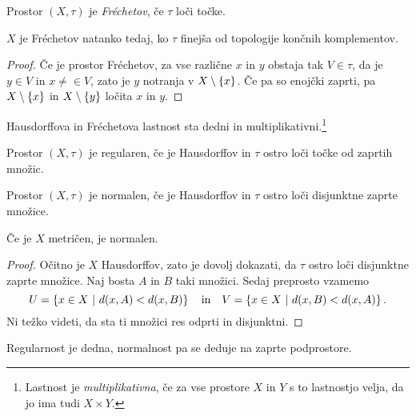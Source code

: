 \begin{definicija}
Prostor $(X, \tau)$ je
\emph{Fréchetov}, če $\tau$
loči točke.
\end{definicija}

\begin{trditev}
$X$ je Fréchetov natanko tedaj, ko $\tau$ finejša od topologije
končnih komplementov.
\end{trditev}

\begin{proof}
Če je prostor Fréchetov, za vse različne $x$ in $y$ obstaja tak
$V \in \tau$, da je $y \in V$ in $x \ne \in V$, zato je $y$
notranja v $X \setminus \left\{x\right\}$. Če pa so enojčki zaprti, pa
$X \setminus \left\{x\right\}$ in $X \setminus \left\{y\right\}$ ločita $x$ in $y$.
\end{proof}

\begin{trditev}
Hausdorffova in Fréchetova lastnost sta dedni in
multiplikativni.\footnote{Lastnost je \emph{multiplikativna}, če za
vse prostore $X$ in $Y$ s to lastnostjo velja, da jo ima tudi
$X \times Y$.}
\end{trditev}

\obvs

\begin{definicija}
Prostor $(X, \tau)$ je regularen, če je Hausdorffov in $\tau$ ostro
loči točke od zaprtih množic.
\end{definicija}

\begin{definicija}
Prostor $(X, \tau)$ je normalen, če je Hausdorffov in $\tau$ ostro
loči disjunktne zaprte množice.
\end{definicija}


\begin{izrek}
Če je $X$ metričen, je normalen.
\end{izrek}

\begin{proof}
Očitno je $X$ Hausdorffov, zato je dovolj dokazati, da $\tau$ ostro
loči disjunktne zaprte množice. Naj bosta $A$ in $B$ taki množici.
Sedaj preprosto vzamemo
\[
U = \left\{x \in X~\middle\vert~d(x,A) < d(x,B)\right\}
\quad \text{in} \quad
V = \left\{x \in X~\middle\vert~d(x,B) < d(x,A)\right\}.
\]
Ni težko videti, da sta ti množici res odprti in disjunktni.
\end{proof}

\begin{trditev}
Regularnost je dedna, normalnost pa se deduje na zaprte
podprostore.
\end{trditev}

